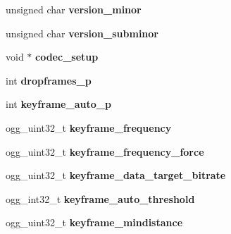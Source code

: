 \begin{DoxyCompactItemize}
\item 
\hypertarget{structtheora__info_a75eda4f30270d833c7b9dba43932a06a}{unsigned char {\bfseries version\+\_\+minor}}\label{structtheora__info_a75eda4f30270d833c7b9dba43932a06a}

\item 
\hypertarget{structtheora__info_aa07967ecd6e20bd2928ead42b6397b3d}{unsigned char {\bfseries version\+\_\+subminor}}\label{structtheora__info_aa07967ecd6e20bd2928ead42b6397b3d}

\item 
\hypertarget{structtheora__info_a719a1d77a4a3bfeab79aa5747dbbb04c}{void $\ast$ {\bfseries codec\+\_\+setup}}\label{structtheora__info_a719a1d77a4a3bfeab79aa5747dbbb04c}

\item 
\hypertarget{structtheora__info_af294db65a8363a0bcf43f4727763b291}{int {\bfseries dropframes\+\_\+p}}\label{structtheora__info_af294db65a8363a0bcf43f4727763b291}

\item 
\hypertarget{structtheora__info_a23648173369174f687085c0ce85ef30e}{int {\bfseries keyframe\+\_\+auto\+\_\+p}}\label{structtheora__info_a23648173369174f687085c0ce85ef30e}

\item 
\hypertarget{structtheora__info_a03e1b3e337af5f9dabaaaeb9050f145a}{ogg\+\_\+uint32\+\_\+t {\bfseries keyframe\+\_\+frequency}}\label{structtheora__info_a03e1b3e337af5f9dabaaaeb9050f145a}

\item 
\hypertarget{structtheora__info_ad9d2e22c44a53473010e6d1042dfe0d8}{ogg\+\_\+uint32\+\_\+t {\bfseries keyframe\+\_\+frequency\+\_\+force}}\label{structtheora__info_ad9d2e22c44a53473010e6d1042dfe0d8}

\item 
\hypertarget{structtheora__info_a588942d1ee90a26a7effdf6a0e98b9ce}{ogg\+\_\+uint32\+\_\+t {\bfseries keyframe\+\_\+data\+\_\+target\+\_\+bitrate}}\label{structtheora__info_a588942d1ee90a26a7effdf6a0e98b9ce}

\item 
\hypertarget{structtheora__info_a95cb8958e29ad3d24047ee8f9e7fd99b}{ogg\+\_\+int32\+\_\+t {\bfseries keyframe\+\_\+auto\+\_\+threshold}}\label{structtheora__info_a95cb8958e29ad3d24047ee8f9e7fd99b}

\item 
\hypertarget{structtheora__info_aa79ca8c0e77a884d4487fd627fae32e9}{ogg\+\_\+uint32\+\_\+t {\bfseries keyframe\+\_\+mindistance}}\label{structtheora__info_aa79ca8c0e77a884d4487fd627fae32e9}


\end{DoxyCompactItemize}
